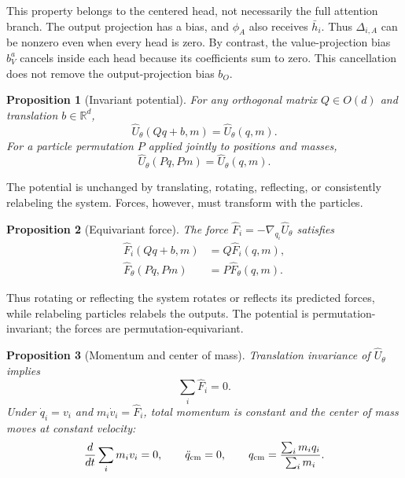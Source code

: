 \documentclass[10pt,letterpaper,twocolumn]{article}
\newtheorem{proposition}{Proposition}[section]
\newcommand{\R}{\mathbb R}
\newcommand{\Fhat}{\widehat F}
\newcommand{\Uhat}{\widehat U}
\numberwithin{equation}{section}
\begin{document}
This property belongs to the centered head, not necessarily the full attention branch. The output
projection has a bias, and $\phi_A$ also receives $\bar h_i$. Thus $\Delta_{i,A}$ can be nonzero
even when every head is zero. By contrast, the value-projection bias $b_V^a$ cancels inside
each head because its coefficients sum to zero. This cancellation does not remove the
output-projection bias $b_O$.

\begin{samepage}
\begin{proposition}[Invariant potential]
\label{prop:potential}
For any orthogonal matrix $Q\in O(d)$ and translation $b\in\R^d$,
\begin{equation}
\Uhat_\theta(Qq+b,m)=\Uhat_\theta(q,m).
\label{eq:uinvariant}
\end{equation}
For a particle permutation $P$ applied jointly to positions and masses,
\begin{equation}
\Uhat_\theta(Pq,Pm)=\Uhat_\theta(q,m).
\label{eq:upermutation}
\end{equation}
\end{proposition}
\end{samepage}

The potential is unchanged by translating, rotating, reflecting, or consistently relabeling the
system. Forces, however, must transform with the particles.

\begin{samepage}
\begin{proposition}[Equivariant force]
\label{prop:force}
The force $\Fhat_i=-\nabla_{q_i}\Uhat_\theta$ satisfies
\begin{equation}
\begin{aligned}
\Fhat_i(Qq+b,m)&=Q\Fhat_i(q,m),\\
\Fhat_\theta(Pq,Pm)&=P\Fhat_\theta(q,m).
\end{aligned}
\label{eq:fequivariant}
\end{equation}
\end{proposition}
\end{samepage}

Thus rotating or reflecting the system rotates or reflects its predicted forces, while relabeling
particles relabels the outputs. The potential is permutation-invariant; the forces are
permutation-equivariant.

\begin{samepage}
\begin{proposition}[Momentum and center of mass]
\label{prop:momentum}
Translation invariance of $\Uhat_\theta$ implies
\begin{equation}
\sum_i\Fhat_i=0.
\label{eq:netforce}
\end{equation}
Under $\dot q_i=v_i$ and $m_i\dot v_i=\Fhat_i$, total momentum is constant and the center of mass
moves at constant velocity:
\begin{equation}
\frac{d}{dt}\sum_i m_iv_i=0,\qquad
\ddot q_{\rm cm}=0,\qquad
q_{\rm cm}=\frac{\sum_i m_iq_i}{\sum_i m_i}.
\label{eq:momentum}
\end{equation}
\end{proposition}
\end{samepage}
\end{document}
